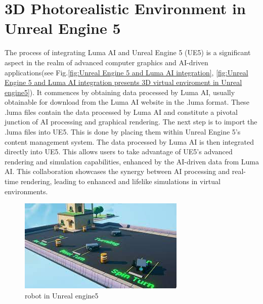 \section{3D Photorealistic Environment in Unreal Engine 5}
\label{sec:3D Photorealistic Environment in Unreal Engine 5}
\singlespacing
The process of integrating Luma AI and Unreal Engine 5 (UE5) is a significant aspect in the realm of advanced computer graphics and AI-driven applications\cite{luma2023unreal}(see Fig.\ref{fig:Unreal Engine 5 and Luma AI integration}, \ref{fig:Unreal Engine 5 and Luma AI integration presents 3D virtual enviroment in Unreal engine5}). It commences by obtaining data processed by Luma AI, usually obtainable for download from the Luma AI website in the .luma format. These .luma files contain the data processed by Luma AI and constitute a pivotal junction of AI processing and graphical rendering.
\singlespacing
The next step is to import the .luma files into UE5. This is done by placing them within Unreal Engine 5's content management system. The data processed by Luma AI is then integrated directly into UE5. This allows users to take advantage of UE5's advanced rendering and simulation capabilities, enhanced by the AI-driven data from Luma AI. This collaboration showcases the synergy between AI processing and real-time rendering, leading to enhanced and lifelike simulations in virtual environments.
\singlespacing
\begin{figure}[htbp]
  \centering
  \includegraphics[scale=1]{./Figure/robot_in_unreal_engine.jpg}
  \caption{robot in Unreal engine5}
  \label{fig:robot in Unreal engine5}
\end{figure}
